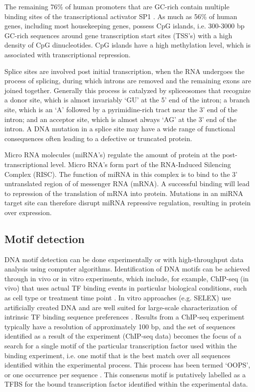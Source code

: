 \documentclass[12pt]{article}
\begin{document}
The remaining 76\% of human promoters that are GC-rich contain multiple binding sites of the transcriptional activator SP1 \citep{yang2007prevalence}. As much as 56\% of human genes, including most housekeeping genes, possess CpG islands, i.e. 300-3000 bp GC-rich sequences around gene transcription start sites (TSS's) with a high density of CpG dinucleotides. CpG islands have a high methylation level, which is associated with transcriptional repression. 

Splice sites are involved post initial transcription, when the RNA undergoes the process of splicing, during which introns are removed and the remaining exons are joined together. Generally this process is catalyzed by spliceosomes that recognize a donor site, which is almost invariably `GU' at the 5' end of the intron; a branch site, which is an `A' followed by a pyrimidine-rich tract near the 3' end of the intron; and an acceptor site, which is almost always `AG' at the 3' end of the intron. A DNA mutation in a splice site may have a wide range of functional consequences often leading to a defective or truncated protein.  

Micro RNA molecules (miRNA's) regulate the amount of protein at the post-transcriptional level. Micro RNA's form part of the RNA-Induced Silencing Complex (RISC). The function of miRNA in this complex is to bind to the 3' untranslated region of of messenger RNA (mRNA). A successful binding will lead to repression of the translation of mRNA into protein. Mutations in an miRNA target site can therefore disrupt miRNA repressive regulation, resulting in protein over expression.

\subsection{Motif detection}
DNA motif detection can be done experimentally or with high-throughput data analysis using computer algorithms. Identification of DNA motifs can be achieved through in vivo or in vitro experiments, which include, for example, ChIP-seq (in vivo) that uses actual TF binding events in particular biological conditions, such as cell type or treatment time point \citep{inukai2017transcription}. In vitro approaches (e.g. SELEX) use artificially created DNA and are well suited for large-scale characterization of intrinsic TF binding sequence preferences \citep{inukai2017transcription}.  Results from a ChIP-seq experiment typically have a resolution of approximately 100 bp, and the set of sequences identified as a result of the experiment (ChIP-seq data) becomes the focus of a search for a single motif of the particular transcription factor used within the binding experiment, i.e. one motif that is the best match over all sequences identified within the experimental process. This process has been termed `OOPS', or one occurrence per sequence \citep{zhang2016entropy}. This consensus motif is putatively labelled as a TFBS for the bound transcription factor identified within the experimental data. 
\end{document}
